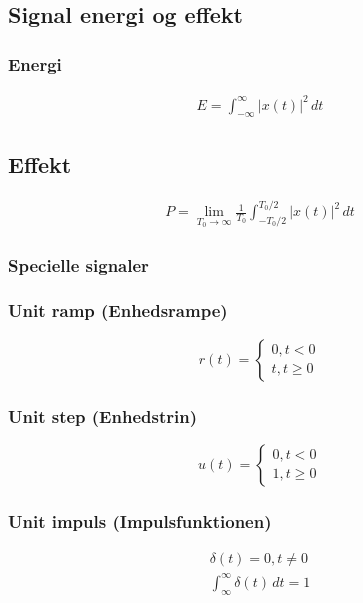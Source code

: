 \subsection{Signal energi og effekt}
	\subsubsection{Energi}
		\begin{align}
			E=\int_{-\infty}^{\infty}|x(t)|^2\,dt
		\end{align}

	\subsection{Effekt}
		\begin{align}
			P=\lim_{T_0\rightarrow\infty}\frac{1}{T_0}\int_{-T_0/2}^{T_0/2}|x(t)|^2\,dt
		\end{align}

\subsubsection{Specielle signaler}
	\subsubsection{Unit ramp (Enhedsrampe)}
		\begin{equation}
			r(t)=\begin{cases}
				0,t<0\\
				t,t\geq 0
			\end{cases}
		\end{equation}

	\subsubsection{Unit step (Enhedstrin)}
		\begin{equation}
			u(t)=\begin{cases}
				0,t<0\\
				1,t\geq 0
			\end{cases}
		\end{equation}

	\subsubsection{Unit impuls (Impulsfunktionen)}
		\begin{align}
			\delta(t)=0,t\neq 0\\
			\int_{\infty}^{\infty}\delta(t)\,dt=1
		\end{align}
	
